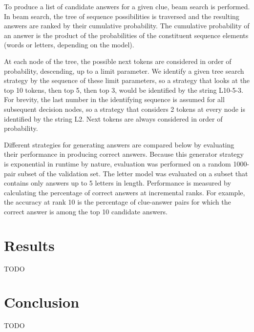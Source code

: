 \documentclass[letterpaper]{article} %
\begin{document}
\begin{NoHyper}
To produce a list of candidate answers for a given clue, beam search is performed. In beam search, the tree of sequence possibilities is traversed and the resulting answers are ranked by their cumulative probability. The cumulative probability of an answer is the product of the probabilities of the constituent sequence elements (words or letters, depending on the model).

At each node of the tree, the possible next tokens are considered in order of probability, descending, up to a limit parameter. We identify a given tree search strategy by the sequence of these limit parameters, so a strategy that looks at the top 10 tokens, then top 5, then top 3, would be identified by the string L10-5-3. For brevity, the last number in the identifying sequence is assumed for all subsequent decision nodes, so a strategy that considers 2 tokens at every node is identified by the string L2. Next tokens are always considered in order of probability.

Different strategies for generating answers are compared below by evaluating their performance in producing correct answers. Because this generator strategy is exponential in runtime by nature, evaluation was performed on a random 1000-pair subset of the validation set. The letter model was evaluated on a subset that contains only answers up to 5 letters in length. Performance is measured by calculating the percentage of correct answers at incremental ranks. For example, the accuracy at rank 10 is the percentage of clue-answer pairs for which the correct answer is among the top 10 candidate answers.

\section{Results}
\label{sec:results}

TODO

\section{Conclusion}
\label{sec:conclusion}

TODO



\end{NoHyper}
\end{document}
